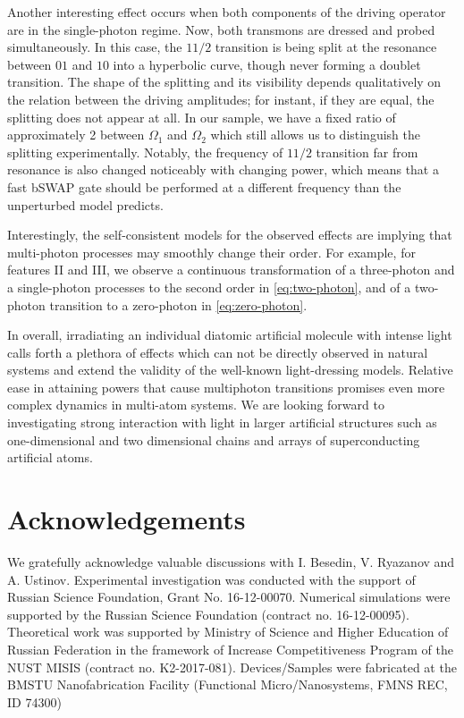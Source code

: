 \documentclass[%
 aps, prx,
 amsmath,amssymb,
 reprint,%
superscriptaddress
]{revtex4-2}
\begin{document}
Another interesting effect occurs when both 
components of the driving operator are in the 
single-photon regime. Now, both transmons are 
dressed and probed simultaneously. In this case, 
the $11/2$ transition is being split at the resonance between $01$ and $10$ into a hyperbolic curve, though never forming a doublet transition. The shape of the splitting and its visibility 
depends qualitatively on the relation between the driving 
amplitudes; for instant, if they are equal, the splitting does not appear at all. In our sample, we have a fixed ratio 
of approximately 2 between $\Omega_1$ and 
$\Omega_2$ which still allows us to distinguish the 
splitting experimentally. Notably, the frequency of $11/2$ transition far 
from resonance is also changed noticeably with 
changing power, which means that a fast bSWAP 
gate should be performed at a different frequency 
than the unperturbed model predicts. 

Interestingly, the self-consistent models for the 
observed effects are implying that multi-photon 
processes may smoothly change their order. For 
example, for features II and III, we observe a 
continuous transformation of a three-photon and a 
single-photon processes to the second order in 
\autoref{eq:two-photon}, and of a two-photon 
transition to a zero-photon in 
\autoref{eq:zero-photon}.

In overall, irradiating an individual diatomic artificial molecule with intense light calls forth a plethora of effects which can not be directly observed in natural systems and extend the validity of the well-known light-dressing models. Relative ease in attaining powers that cause multiphoton transitions promises even more complex dynamics in multi-atom systems. We are looking forward to investigating strong interaction with light in larger artificial structures such as one-dimensional and two dimensional chains and arrays of superconducting artificial atoms.

\section{Acknowledgements}

We gratefully acknowledge valuable discussions with I. Besedin, V. Ryazanov and A. Ustinov. 
Experimental investigation was conducted with the support of Russian Science Foundation, Grant No. 16-12-00070. Numerical simulations were supported by the Russian Science Foundation (contract no. 16-12-00095). Theoretical work was supported by Ministry of Science and Higher Education of Russian Federation in the framework of Increase Competitiveness Program of the NUST MISIS (contract no. K2-2017-081). Devices/Samples were fabricated at the BMSTU Nanofabrication Facility (Functional Micro/Nanosystems, FMNS REC, ID 74300)
\end{document}
